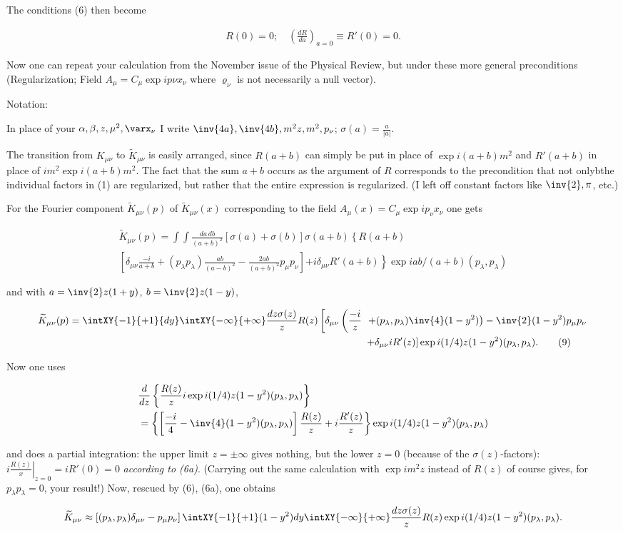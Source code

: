 \documentclass{article}
\newcommand{\nequ}[2]{
\begin{align*}
#1
\tag{#2}
\end{align*}
}
\newcommand{\uequ}[1]{
\begin{align*}
#1
\end{align*}
}
\begin{document}
The conditions (6) then become
\nequ{
R(0) = 0;\quad \left(\frac{{dR}}{{da}}\right)_{a=0} \equiv R'(0) = 0.
}{6a}

Now one can repeat your calculation from the November issue of the Physical Review, but under these more general preconditions (Regularization; Field $A_\mu = C_\mu\exp{ip\nu x_\nu}$ where $\varrho_\nu$ is not necessarily a null vector).

Notation:

In place of your $\alpha, \beta, z, \mu^2, \varx_\nu$ I write $\inv{4a}, \inv{4b}, m^2 z, m^2, p_\nu
$; $\sigma(a) = \frac{a}{|a|}$.

The transition from $K_{\mu\nu}$ to $\widetilde{K}_{\mu\nu}$ is easily arranged, since $R(a+b)$ can simply be put in place of $\exp{i(a+b)m^2}$ and $R'(a+b)$ in place of $im^2\exp{i(a+b)m^2}$. The fact that the sum $a+b$ occurs as the argument of $R$ corresponds to the precondition that not onlybthe individual factors in (1) are regularized, but rather that the entire expression is regularized. (I left off constant factors like $\inv{2},\pi$, etc.)

For the Fourier component $\widetilde{K}_{\mu\nu}(p)$ of $\widetilde{K}_{\mu\nu}(x)$ corresponding to the field $A_\mu(x) = C_\mu \exp{i p_\nu x_\nu}$ one gets
\nequ{
\widetilde{K}_{\mu\nu}(p) = \int\int\frac{{da}\,{db}}{(a+b)^2}\left[\sigma(a)+\sigma(b)\right]
\sigma(a+b)\left\{R(a+b)\right.\\
\left[\delta_{\mu\nu}\frac{-i}{a+b} + (p_\lambda p_\lambda) \frac{ab}{(a-b)^2} - 
\frac{2ab}{(a+b)^2}p_\mu p_\nu\right]\left. + i\delta_{\mu\nu}R'(a+b)\right\} \exp{iab/(a+b)(p_\lambda, p_\lambda)}
}{8}
and with $a=\inv{2}z(1+y)$, $b=\inv{2}z(1-y)$,
\nequ{
\widetilde{K}_{\mu\nu}(p) = \intXY{-1}{+1}{dy}
\intXY{-\infty}{+\infty}\frac{{dz}\sigma(z)}{z}R(z)\left[\delta_{\mu\nu}\left(
\frac{-i}{z} \right.\right.&\left.\left.+ (p_\lambda,p_\lambda)\inv{4}(1-y^2)\right)
- \inv{2}(1-y^2)p_\mu p_\nu \right. \\
&\left.+ \delta_{\mu\nu} i R'(z)\right] \exp{i(1/4)z(1-y^2)(p_\lambda,p_\lambda)}.
}{9}
Now one uses
\uequ{
&\frac{d}{{dz}}\left\{\frac{R(z)}{z}i\exp{i(1/4)z(1-y^2)(p_\lambda,p_\lambda)}\right\}\\
& = \left\{\left[\frac{-i}{4} - \inv{4}(1-y^2)(p_\lambda,p_\lambda)\right]
\frac{R(z)}{z} + i\frac{R'(z)}{z}\right\}
\exp{i(1/4)z(1-y^2)(p_\lambda, p_\lambda)}
}
and does a partial integration: the upper limit $z=\pm \infty$ gives nothing, but the lower $z=0$ (because of the $\sigma(z)$-factors): $i\left.\frac{R(z)}{x}\right|_{z=0} = iR'(0) = 0$ \textit{according to (6a)}.
(Carrying out the same calculation with $\exp{im^2z}$ instead of $R(z)$ of course gives, for $p_\lambda p_\lambda=0$, your result!) Now, rescued by (6), (6a), one obtains
\uequ{
\widetilde{K}_{\mu\nu} \approx \left[(p_\lambda, p_\lambda)\delta_{\mu\nu} - p_\mu p_\nu\right]
\intXY{-1}{+1}(1-y^2){dy}\intXY{-\infty}{+\infty}\frac{{dz}\sigma(z)}{z}R(z)
\exp{i(1/4)z(1-y^2)(p_\lambda, p_\lambda)}.
}
\end{document}

